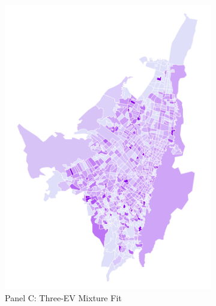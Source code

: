\documentclass{article}
\begin{document}
\begin{figure}[p]
    \begin{subfigure}[b]{0.4\textwidth}
        \includegraphics[width=\linewidth]{figs_dep_maps/mapa_dep_2019.png}
        \caption{Panel C: Three-EV Mixture Fit}
        \label{fig:panelC}
    \end{subfigure}
    \hfill
    \begin{subfigure}[b]{0.4\textwidth}

\end{subfigure}
\end{figure}
\end{document}
